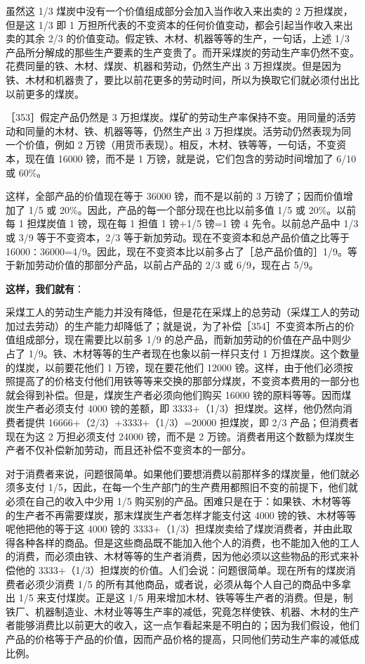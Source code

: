 虽然这 1/3 煤炭中没有一个价值组成部分会加入当作收入来出卖的 2 万担煤炭，但是这 1/3 即 1 万担所代表的不变资本的任何价值变动，都会引起当作收入来出卖的其余 2/3 的价值变动。假定铁、木材、机器等等的生产，一句话，上述 1/3 产品所分解成的那些生产要素的生产变贵了。而开采煤炭的劳动生产率仍然不变。花费同量的铁、木材、煤炭、机器和劳动，仍然生产出 3 万担煤炭。但是因为铁、木材和机器贵了，要比以前花更多的劳动时间，所以为换取它们就必须付出比以前更多的煤炭。

［353］假定产品仍然是 3 万担煤炭。煤矿的劳动生产率保持不变。用同量的活劳动和同量的木材、铁、机器等等，仍然生产出 3 万担煤炭。活劳动仍然表现为同一个价值，例如 2 万镑（用货币表现）。相反，木材、铁等等，一句话，不变资本，现在值 16000 镑，而不是 1 万镑，就是说，它们包含的劳动时间增加了 6/10 或 60\%。

这样，全部产品的价值现在等于 36000 镑，而不是以前的 3 万镑了；因而价值增加了 1/5 或 20\%。因此，产品的每一个部分现在也比以前多值 1/5 或 20\%。以前每 1 担煤炭值 1 镑，现在每 1 担值 1 镑+1/5 镑=1 镑 4 先令。以前总产品中 1/3 或 3/9 等于不变资本，2/3 等于新加劳动。现在不变资本和总产品价值之比等于 16000∶36000=4/9。因此，现在不变资本比以前多占了［总产品价值的］1/9。等于新加劳动价值的那部分产品，以前占产品的 2/3 或 6/9，现在占 5/9。

\textbf{这样，我们就有}：

采煤工人的劳动生产能力并没有降低，但是花在采煤上的总劳动（采煤工人的劳动加过去劳动）的生产能力却降低了；就是说，为了补偿［354］不变资本所占的价值组成部分，现在需要比以前多 1/9 的总产品，而新加劳动的价值在产品中则少占了 1/9。铁、木材等等的生产者现在也象以前一样只支付 1 万担煤炭。这个数量的煤炭，以前要花他们 1 万镑，现在要花他们 12000 镑。这样，由于他们必须按照提高了的价格支付他们用铁等等来交换的那部分煤炭，不变资本费用的一部分也就会得到补偿。但是，煤炭生产者必须向他们购买 16000 镑的原料等等。因而煤炭生产者必须支付 4000 镑的差额，即 3333+（1/3）担煤炭。这样，他仍然向消费者提供 16666+（2/3）+3333+（1/3）=20000 担煤炭，即 2/3 产品；但消费者现在为这 2 万担必须支付 24000 镑，而不是 2 万镑。消费者用这个数额为煤炭生产者不仅补偿新加劳动，而且还补偿不变资本的一部分。

对于消费者来说，问题很简单。如果他们要想消费以前那样多的煤炭量，他们就必须多支付 1/5，因此，在每一个生产部门的生产费用都照旧不变的前提下，他们就必须在自己的收入中少用 1/5 购买别的产品。困难只是在于：如果铁、木材等等的生产者不再需要煤炭，那末煤炭生产者怎样才能支付这 4000 镑的铁、木材等等呢他把他的等于这 4000 镑的 3333+（1/3）担煤炭卖给了煤炭消费者，并由此取得各种各样的商品。但是这些商品既不能加入他个人的消费，也不能加入他的工人的消费，而必须由铁、木材等等的生产者消费，因为他必须以这些物品的形式来补偿他的 3333+（1/3）担煤炭的价值。人们会说：问题很简单。现在所有的煤炭消费者必须少消费 1/5 的所有其他商品，或者说，必须从每个人自己的商品中多拿出 1/5 来支付煤炭。正是这 1/5 用来增加木材、铁等等生产者的消费。但是，制铁厂、机器制造业、木材业等等生产率的减低，究竟怎样使铁、机器、木材的生产者能够消费比以前更大的收入，这一点乍看起来是不明白的；因为我们假设，他们产品的价格等于产品的价值，因而产品价格的提高，只同他们劳动生产率的减低成比例。

